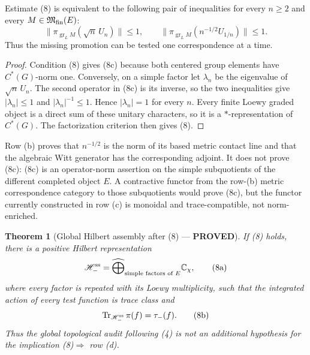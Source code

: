 \documentclass[11pt]{article}
\newcommand{\PROVED}{\textcolor{green!40!black}{\textbf{PROVED}}}
\newtheorem{theorem}{Theorem}
\begin{document}
\begin{corollary}[One-generator reduction --- \PROVED]
Estimate (8) is equivalent to the following pair of inequalities for every
$n\ge2$ and every $M\in\mathfrak M_{\rm fin}(E)$:
\begin{equation}
 \boxed{
 \|\pi_{\operatorname{gr}_L M}(\sqrt n\,U_n)\|\le1,
 \qquad
 \|\pi_{\operatorname{gr}_L M}(n^{-1/2}U_{1/n})\|\le1.}       \tag{8c}
\end{equation}
Thus the missing promotion can be tested one correspondence at a time.
\end{corollary}

\begin{proof}
Condition (8) gives (8c) because both centered group elements have
$C^*(G)$-norm one.  Conversely, on a simple factor let $\lambda_n$ be the
eigenvalue of $\sqrt n\,U_n$.  The second operator in (8c) is its inverse,
so the two inequalities give $|\lambda_n|\le1$ and
$|\lambda_n|^{-1}\le1$.  Hence $|\lambda_n|=1$ for every $n$.  Every
finite Loewy graded object is a direct sum of these unitary characters, so
it is a $*$-representation of $C^*(G)$.  The factorization criterion then
gives (8).
\end{proof}

Row (b) proves that $n^{-1/2}$ is the norm of its based metric contact line
and that the algebraic Witt generator has the corresponding adjoint.  It
does not prove (8c): (8c) is an operator-norm assertion on the simple
subquotients of the different completed object $E$.  A contractive functor
from the row-(b) metric correspondence category to those subquotients would
prove (8c), but the functor currently constructed in row (c) is monoidal
and trace-compatible, not norm-enriched.

\begin{theorem}[Global Hilbert assembly after (8) --- \PROVED]
If (8) holds, there is a positive Hilbert representation
\begin{equation}
 \mathscr H_-^{\rm ss}
 =\widehat\bigoplus_{\text{simple factors of }E}
        \mathbb C_{\chi},                            \tag{8a}
\end{equation}
where every factor is repeated with its Loewy multiplicity, such that the
integrated action of every test function is trace class and
\begin{equation}
 \operatorname{Tr}_{\mathscr H_-^{\rm ss}}\pi(f)=\tau_-(f).    \tag{8b}
\end{equation}
Thus the global topological audit following (4) is not an additional
hypothesis for the implication (8)$\Rightarrow$ row (d).
\end{theorem}
\end{document}
